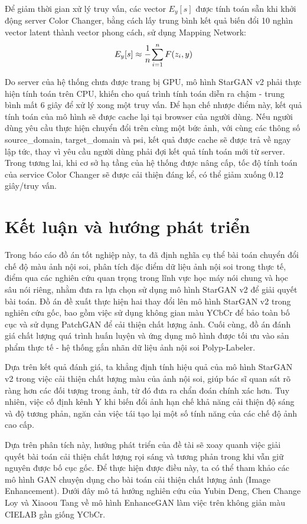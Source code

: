 \documentclass[12pt]{extreport}
\begin{document}
Để giảm thời gian xử lý truy vấn, các vector $ E_y [s] $ được tính toán sẵn khi khởi động server Color Changer, bằng cách lấy trung bình kết quả biến đổi 10 nghìn vector latent thành vector phong cách, sử dụng Mapping Network:
$$ E_y[s] \approx \cfrac{1}{n} \sum_{i = 1}^{n} F(z_{i}, y) $$

Do server của hệ thống chưa được trang bị GPU, mô hình StarGAN v2 phải thực hiện tính toán trên CPU, khiến cho quá trình tính toán diễn ra chậm - trung bình mất 6 giây để xử lý xong một truy vấn. Để hạn chế nhược điểm này, kết quả tính toán của mô hình sẽ được cache lại tại browser của người dùng. Nếu người dùng yêu cầu thực hiện chuyển đổi trên cùng một bức ảnh, với cùng các thông số source\_domain, target\_domain và psi, kết quả được cache sẽ được trả về ngay lập tức, thay vì yêu cầu người dùng phải đợi kết quả tính toán mới từ server. Trong tương lai, khi cơ sở hạ tầng của hệ thống được nâng cấp, tốc độ tính toán của service Color Changer sẽ được cải thiện đáng kể, có thể giảm xuống 0.12 giây/truy vấn.

\chapter*{Kết luận và hướng phát triển}

Trong báo cáo đồ án tốt nghiệp này, ta đã định nghĩa cụ thể bài toán chuyển đổi chế độ màu ảnh nội soi, phân tích đặc điểm dữ liệu ảnh nội soi trong thực tế, điểm qua các nghiên cứu quan trọng trong lĩnh vực học máy nói chung và học sâu nói riêng, nhằm đưa ra lựa chọn sử dụng mô hình StarGAN v2 để giải quyết bài toán. Đồ án đề xuất thực hiện hai thay đổi lên mô hình StarGAN v2 trong nghiên cứu gốc, bao gồm việc sử dụng không gian màu YCbCr để bảo toàn bố cục và sử dụng PatchGAN để cải thiện chất lượng ảnh. Cuối cùng, đồ án đánh giá chất lượng quá trình huấn luyện và ứng dụng mô hình được tối ưu vào sản phẩm thực tế - hệ thống gắn nhãn dữ liệu ảnh nội soi Polyp-Labeler.

Dựa trên kết quả đánh giá, ta khẳng định tính hiệu quả của mô hình StarGAN v2 trong việc cải thiện chất lượng màu của ảnh nội soi, giúp bác sĩ quan sát rõ ràng hơn các đối tượng trong ảnh, từ đó đưa ra chẩn đoán chính xác hơn. Tuy nhiên, việc cố định kênh Y khi biến đổi ảnh hạn chế khả năng cải thiện độ sáng và độ tương phản, ngăn cản việc tái tạo lại một số tính năng của các chế độ ảnh cao cấp.

Dựa trên phân tích này, hướng phát triển của đề tài sẽ xoay quanh việc giải quyết bài toán cải thiện chất lượng rọi sáng và tương phản trong khi vẫn giữ nguyên được bố cục gốc. Để thực hiện được điều này, ta có thể tham khảo các mô hình GAN chuyện dụng cho bài toán cải thiện chất lượng ảnh (Image Enhancement). Dưới đây mô tả hướng nghiên cứu của Yubin Deng, Chen Change Loy và Xiaoou Tang về mô hình EnhanceGAN \cite{DBLP:journals/corr/DengLT17} làm việc trên không giản màu CIELAB gần giống YCbCr.
\end{document}
